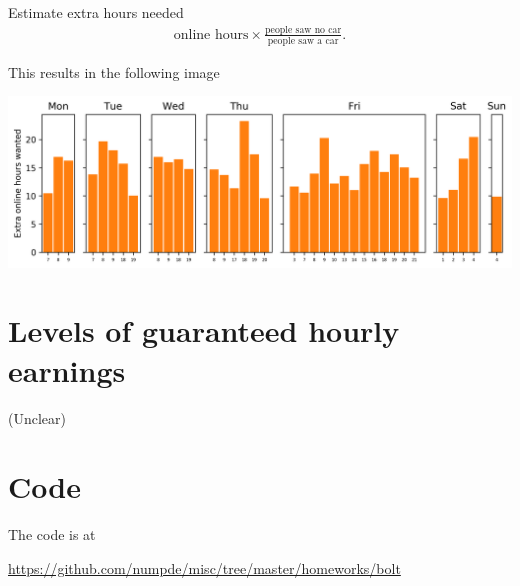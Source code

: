 \documentclass[12pt,a4paper]{article}
\begin{document}
    Estimate extra hours needed 
    \begin{align}
        \text{online hours} \times
        \frac{\text{people saw no car}}{\text{people saw a car}}
        .
    \end{align}

    This results in the following image
    \begin{center}
        \includegraphics[width=\textwidth]{task4/extra_hours}
    \end{center}
    
    
    \section{Levels of guaranteed hourly earnings}
    
    (Unclear)
    
    
    \section*{Code}
    
    The code is at
    \begin{center}
        \url{https://github.com/numpde/misc/tree/master/homeworks/bolt}
    \end{center}
\end{document}
